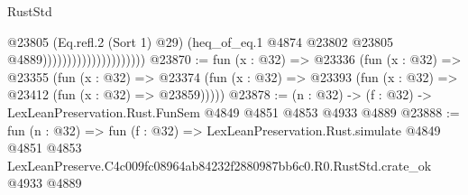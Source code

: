 \begin{lexlean}{RustStd}
\begin{coremodule}
                                            @23805
                                            (Eq.refl.{2} (Sort 1) @29)
                                            (heq_of_eq.{1}
                                              @4874
                                              @23802
                                              @23805
                                              @4889)))))))))))))))))))))
@23870 := fun (x : @32) =>
  @23336
    (fun (x : @32) =>
    @23355
      (fun (x : @32) =>
      @23374 (fun (x : @32) => @23393 (fun (x : @32) => @23412 (fun (x : @32) => @23859)))))
@23878 := (n : @32) -> (f : @32) -> LexLeanPreservation.Rust.FunSem @4849 @4851 @4853 @4933 @4889
@23888 := fun (n : @32) =>
  fun (f : @32) =>
  LexLeanPreservation.Rust.simulate
    @4849
    @4851
    @4853
    LexLeanPreserve.C4c009fc08964ab84232f2880987bb6c0.R0.RustStd.crate_ok
    @4933
    @4889
\end{coremodule}
\end{lexlean}
